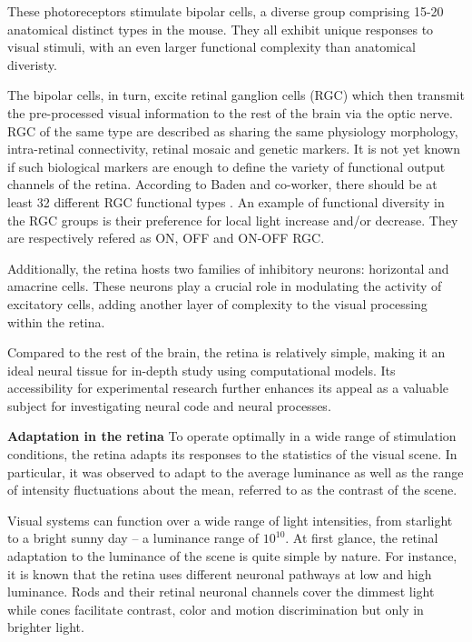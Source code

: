 These photoreceptors stimulate bipolar cells, a diverse group comprising 15-20
anatomical
distinct types in the mouse. They all exhibit unique
responses to visual stimuli, with an even larger functional complexity than
anatomical diveristy. %

The bipolar cells, in turn, excite retinal ganglion cells (RGC) which then
transmit the pre-processed visual  information to the rest of the
brain via the optic nerve.
RGC of the same type are described as sharing the same
physiology morphology,
intra-retinal connectivity, retinal mosaic and genetic markers. It is not yet
known if such biological markers are enough to define the variety of functional
output channels of the retina. According to Baden and co-worker, there should
be at least 32 different RGC
functional types \citep*{baden_functional_2016}. An example of functional
diversity in the RGC groups is their preference for local light increase and/or
decrease. They are respectively refered as ON, OFF and ON-OFF RGC.

Additionally, the retina hosts two families of inhibitory neurons: horizontal
and
amacrine cells. These neurons play a crucial role in modulating the activity of
excitatory cells, adding another layer of complexity to the visual processing
within the retina.

Compared to the rest of the brain, the retina is relatively simple,
making it an ideal neural tissue for in-depth study using computational models.
Its accessibility for experimental research further enhances its appeal as a
valuable subject for investigating neural code and neural processes.

\textbf{Adaptation in the retina}
To operate optimally in a wide range of
stimulation conditions, the retina adapts its responses to the statistics of
the visual scene.
In particular, it was observed to adapt to the average
luminance as well as the range of intensity fluctuations about the mean,
referred to as the contrast of the scene.

Visual systems can function over a wide range of light intensities, from
starlight to a bright sunny day – a luminance range of $10^{10}$.
At first glance, the retinal adaptation to the luminance of the scene is quite
simple by nature.
For instance, it is known that the retina uses different neuronal
pathways at low and high luminance. Rods and their retinal neuronal channels
cover the dimmest light while cones facilitate contrast, color and motion
discrimination but only in brighter light.

